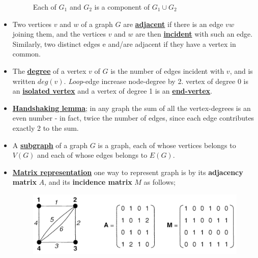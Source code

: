 \documentclass[12pt,a4paper, twocolumn]{article}
\begin{document}
\begin{itemize}
\begin{figure}[h!]
	\caption{Each of $G_1$ and $G_2$ is a component of $G_1 \cup G_2$}
	\end{figure}
\item Two vertices $v$ and $w$ of a graph $G$ are \underline{\textbf{adjacent}} if there is an edge $vw$ joining them, and the vertices $v$ and $w$ are then \underline{\textbf{incident}} with such an edge. Similarly, two distinct edges e and/are adjacent if they have a vertex in common.
\item The \underline{\textbf{degree}} of a vertex $v$ of $G$ is the number of edges incident with $v$, and is written $deg(v)$. \emph{Loop}-edge increase node-degree by 2. vertex of degree 0 is an \underline{\textbf{isolated vertex}} and a vertex of degree 1 is an \underline{\textbf{end-vertex}}.
\item \textbf{\underline{Handshaking lemma}}; in any graph the sum of all the vertex-degrees is an even number - in
fact, twice the number of edges, since each edge contributes exactly 2 to the sum.
\item A \textbf{\underline{subgraph}} of a graph $G$ is a graph, each of whose vertices belongs to $V(G)$ and each
of whose edges belongs to $E(G)$.
\item \underline{\textbf{Matrix representation}} one way to represent graph is by its \textbf{adjacency matrix} $A$, and its \textbf{incidence matrix} $M$ as follows;
	\begin{figure}[h!]
	\centering
	\includegraphics[scale=0.55]{figures/matrixRepresentation.png}
	\end{figure}
\end{itemize}
\newpage
\end{document}
